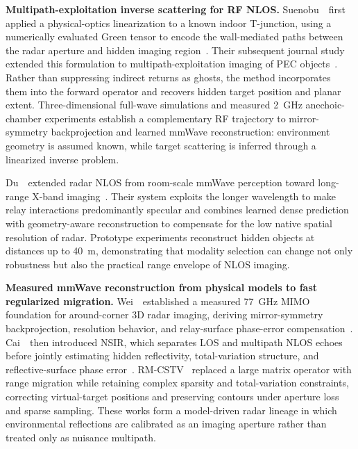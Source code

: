 \vspace{0.8mm}
\noindent \textbf{Multipath-exploitation inverse scattering for RF NLOS.}
Suenobu~\etal~first applied a physical-optics linearization to a known indoor T-junction, using a numerically evaluated Green tensor to encode the wall-mediated paths between the radar aperture and hidden imaging region~\cite{suenobuPhysicalOpticsNLOS2024}. Their subsequent journal study extended this formulation to multipath-exploitation imaging of PEC objects~\cite{suenobuMultipathInverseScatteringNLOS2025}. Rather than suppressing indirect returns as ghosts, the method incorporates them into the forward operator and recovers hidden target position and planar extent. Three-dimensional full-wave simulations and measured 2~GHz anechoic-chamber experiments establish a complementary RF trajectory to mirror-symmetry backprojection and learned mmWave reconstruction: environment geometry is assumed known, while target scattering is inferred through a linearized inverse problem.

Du~\etal~extended radar NLOS from room-scale mmWave perception toward long-range X-band imaging~\cite{duXBandRadarNLOS2026}. Their system exploits the longer wavelength to make relay interactions predominantly specular and combines learned dense prediction with geometry-aware reconstruction to compensate for the low native spatial resolution of radar. Prototype experiments reconstruct hidden objects at distances up to 40~m, demonstrating that modality selection can change not only robustness but also the practical range envelope of NLOS imaging.


\vspace{0.8mm}
\noindent \textbf{Measured mmWave reconstruction from physical models to fast regularized migration.}
Wei~\etal~established a measured 77~GHz MIMO foundation for around-corner 3D radar imaging, deriving mirror-symmetry backprojection, resolution behavior, and relay-surface phase-error compensation~\cite{weiMillimeterWaveNLOS3D2022}. Cai~\etal~then introduced NSIR, which separates LOS and multipath NLOS echoes before jointly estimating hidden reflectivity, total-variation structure, and reflective-surface phase error~\cite{caiPreciseRadarNLOS2024}. RM-CSTV~\cite{liuRMCSTVRadarNLOS2024} replaced a large matrix operator with range migration while retaining complex sparsity and total-variation constraints, correcting virtual-target positions and preserving contours under aperture loss and sparse sampling. These works form a model-driven radar lineage in which environmental reflections are calibrated as an imaging aperture rather than treated only as nuisance multipath.


